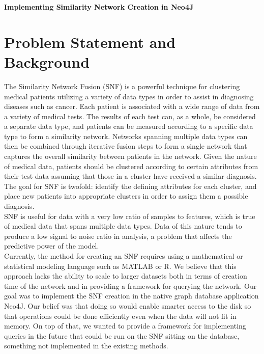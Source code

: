 \documentclass[12pt]{article}
\begin{document}
\large\center\textbf{Implementing Similarity Network Creation in Neo4J}\\
\normalsize{}

\flushleft
\section*{Problem Statement and Background}
\quad The Similarity Network Fusion (SNF) is a powerful technique for clustering medical patients utilizing a variety of data types in order to assist in diagnosing diseases such as cancer. Each patient is associated with a wide range of data from a variety of medical tests. The results of each test can, as a whole, be considered a separate data type, and patients can be measured according to a specific data type to form a similarity network. Networks spanning multiple data types can then be combined through iterative fusion steps to form a single network that captures the overall similarity between patients in the network. Given the nature of medical data, patients should be clustered according to certain attributes from their test data assuming that those in a cluster have received a similar diagnosis. The goal for SNF is twofold: identify the defining attributes for each cluster, and place new patients into appropriate clusters in order to assign them a possible diagnosis.\\
\quad SNF is useful for data with a very low ratio of samples to features, which is true of medical data that spans multiple data types. Data of this nature tends to produce a low signal to noise ratio in analysis, a problem that affects the predictive power of the model.\\
\quad Currently, the method for creating an SNF requires using a mathematical or statistical modeling language such as MATLAB or R. We believe that this approach lacks the ability to scale to larger datasets both in terms of creation time of the network and in providing a framework for querying the network. Our goal was to implement the SNF creation in the native graph database application Neo4J. Our belief was that doing so would enable smarter access to the disk so that operations could be done efficiently even when the data will not fit in memory. On top of that, we wanted to provide a framework for implementing queries in the future that could be run on the SNF sitting on the database, something not implemented in the existing methods.\\
\end{document}
